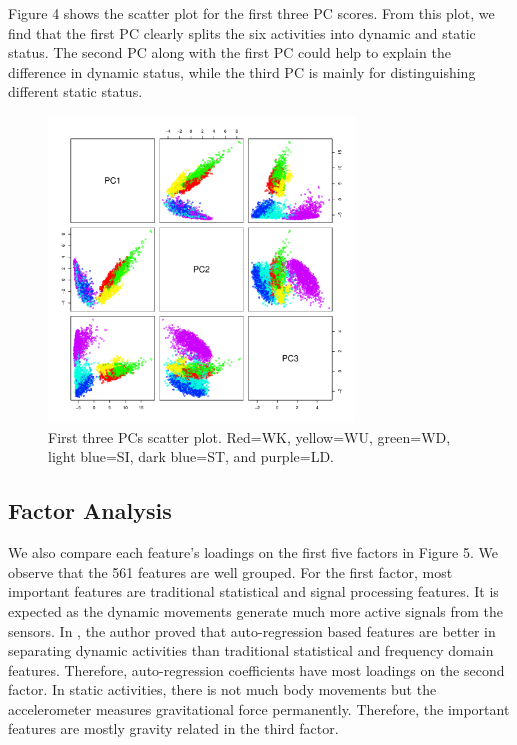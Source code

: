 \documentclass[conference]{IEEEtran}
\begin{document}
Figure 4 shows the scatter plot for the first three PC scores. From this plot, we find that the first PC clearly splits the six activities into dynamic and static status. The second PC along with the first PC could help to explain the difference in dynamic status, while the third PC is mainly for distinguishing different static status. 

\begin{figure}[!ht]
\centering
\includegraphics[width=3.2in]{figure4.pdf}
\caption{First three PCs scatter plot. Red=WK, yellow=WU, green=WD, light blue=SI, dark blue=ST, and purple=LD.
}
\label{fig_sim}
\end{figure}

\subsection{Factor Analysis}
We also compare each feature's loadings on the first five factors in Figure 5. We observe that the 561 features are well grouped. For the first factor, most important features are traditional statistical and signal processing features. It is expected as the dynamic movements generate much more active signals from the sensors. In \cite{he2008activity}, the author proved that auto-regression based features are better in separating dynamic activities than traditional statistical and frequency domain features. Therefore, auto-regression coefficients have most loadings on the second factor. In static activities, there is not much body movements but the accelerometer measures gravitational force permanently. Therefore, the important features are mostly gravity related in the third factor.
\end{document}

